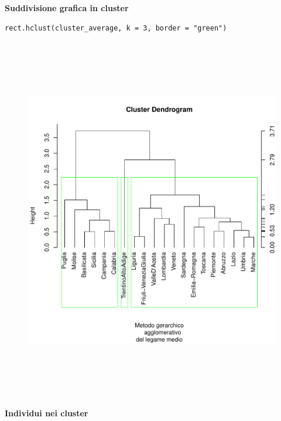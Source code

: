 \noindent \textbf{Suddivisione grafica in cluster}

\vspace{5mm}
\begin{lstlisting}
rect.hclust(cluster_average, k = 3, border = "green")
\end{lstlisting}
\vspace{5mm}

\vspace{5mm}
\begin{figure}[!htbp]
    \centering
    \includegraphics[height=16cm]{ProgettoSAD/capitoli/images/clustering/dendro_cl_medio_sudd.pdf}
\end{figure}
\vspace{5mm}

\noindent \textbf{Individui nei cluster}


